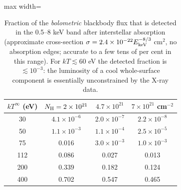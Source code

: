\documentclass[11pt,a4paper]{article}
\begin{document}
\begin{table}[htbp]
\centering\small
\caption{Fraction of the \emph{bolometric} blackbody flux that is detected in the 0.5--8 keV band after interstellar absorption (approximate cross-section $\sigma=2.4\times10^{-22}E_{\rm keV}^{-8/3}$ cm$^2$, no absorption edges; accurate to a few tens of per cent in this range). For $kT\lesssim 60$ eV the detected fraction is $\lesssim 10^{-3}$: the luminosity of a cool whole-surface component is essentially unconstrained by the X-ray data.}\label{tab:frac}
\begin{adjustbox}{max width=\textwidth}\begin{tabular}{cccc}
\toprule
$kT^\infty$ (eV) & $N_{\rm H}=2\times10^{21}$ & $4.7\times10^{21}$ & $7\times10^{21}$ cm$^{-2}$\\
\midrule
30 & $4.1\times10^{-6}$ & $2.0\times10^{-7}$ & $2.2\times10^{-8}$\\
50 & $1.1\times10^{-3}$ & $1.1\times10^{-4}$ & $2.5\times10^{-5}$\\
75 & 0.016 & $3.0\times10^{-3}$ & $1.0\times10^{-3}$\\
112 & 0.086 & 0.027 & 0.013\\
200 & 0.339 & 0.182 & 0.124\\
400 & 0.702 & 0.547 & 0.465\\
\bottomrule
\end{tabular}\end{adjustbox}
\end{table}
\end{document}
